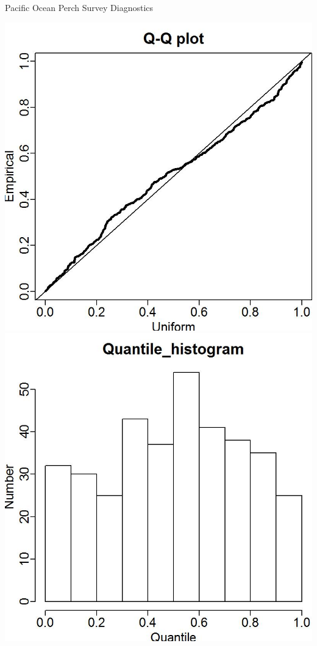\documentclass[pdf]{beamer}\usepackage[]{graphicx}\usepackage[]{color}
\begin{document}
\begin{frame}{Pacific Ocean Perch Survey Diagnostics}
  \begin{center}
  \includegraphics[scale = 0.50]{figures/POP_Q-Q_plot.jpg}
  \includegraphics[scale = 0.50]{figures/POP_Q-Q_hist.jpg}
  \end{center}
\end{frame}
\end{document}
